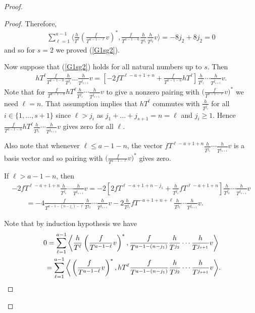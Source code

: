 \documentclass[pdftex]{sigma}
\numberwithin{equation}{section}
\begin{document}
\begin{proof}
\begin{proof}
Therefore,
\begin{gather*}
\sum_{\ell=1}^{a-1} \bigg\langle \frac{h}{T^{\ell}} \left(\frac{f}{T^{a-1-\ell}}v\right)^*, \frac{f}{T^{a-1-n}} \frac{h}{T^{j_1}} \frac{h}{T^{j_2}} v \bigg\rangle = -8 j_2 + 8 j_2 = 0
\end{gather*}
and so for $s=2$ we proved (\ref{G1sg2}).

Now suppose that (\ref{G1sg2}) holds for all natural numbers up to $s$. Then
\begin{gather*}
hT^{\ell} \frac{f}{T^{a-1-n}} \frac{h}{T^{j_1}}\dots\frac{h}{T^{j_{s+1}}} v = \left[ -2 fT^{\ell-a+1+n} + \frac{f}{T^{a-1-n}} hT^{\ell} \right] \frac{h}{T^{j_1}}\cdots\frac{h}{T^{j_{s+1}}} v.
\end{gather*}
Note that for $\frac{f}{T^{a-1-n}} hT^{\ell} \frac{h}{T^{j_1}} \cdots \frac{h}{T^{j_{s+1}}} v$ to give a nonzero pairing with $\big(\frac{f}{T^{a-1-\ell}}v\big)^*$
we need $\ell=n$. That assumption implies that $hT^{\ell}$ commutes with $\frac{h}{T^{j_i}}$ for all $i \in \{1, \dots, s+1\}$ since $\ell > j_i$ as $j_1+\dots +j_{s+1} =n=\ell$ and $j_i \geq 1$. Hence $ \frac{f}{T^{a-1-n}} hT^{\ell} \frac{h}{T^{j_1}}\cdots \frac{h}{T^{j_{s+1}}} v $ gives zero for all $\ell$.

Also note that whenever $\ell \leq a-1-n$, the vector $fT^{\ell-a+1+n} \frac{h}{T^{j_1}} \cdots \frac{h}{T^{j_{s+1}}} v$ is a basis vector and so pairing with $\big(\frac{f}{T^{a-1-\ell}}v\big)^*$ gives zero.

If $\ell > a-1-n$, then
\begin{gather}
-2 fT^{\ell-a+1+n} \frac{h}{T^{j_1}}\cdots\frac{h}{T^{j_{s+1}}} v=-2 \left[ 2fT^{\ell-a+1+n - j_1} + \frac{h}{T^{j_1}} fT^{\ell-a+1+n}\right] \frac{h}{T^{j_2}}\cdots\frac{h}{T^{j_{s+1}}} v \nonumber \\
\qquad{} = -4 \frac{f}{T^{a-1 - (n-j_1) - \ell}}\frac{h}{T^{j_2}}\cdots\frac{h}{T^{j_{s+1}}}v - 2 \frac{h}{T^{j_1}} fT^{-a+1 + n + \ell} \frac{h}{T^{j_2}}\cdots\frac{h}{T^{j_{s+1}}}v. \label{fs sum}
\end{gather}

Note that by induction hypothesis we have
\begin{gather*}
0 = \sum_{\ell=1}^{a-1} \bigg\langle \frac{h}{T^{\ell}} \left(\frac{f}{T^{a-1-\ell}}v\right)^*, \frac{f}{T^{a-1-(n-j_1)}} \frac{h}{T^{j_2}}\cdots\frac{h}{T^{j_{s+1}}} v \bigg\rangle \nonumber \\
\hphantom{0} = \sum_{\ell=1}^{a-1} \bigg\langle \left(\frac{f}{T^{a-1-\ell}}v\right)^*, hT^{\ell} \frac{f}{T^{a-1-(n-j_1)}} \frac{h}{T^{j_2}}\cdots\frac{h}{T^{j_{s+1}}} v \bigg\rangle. %
\end{gather*}


\end{proof}
\end{proof}
\end{document}
